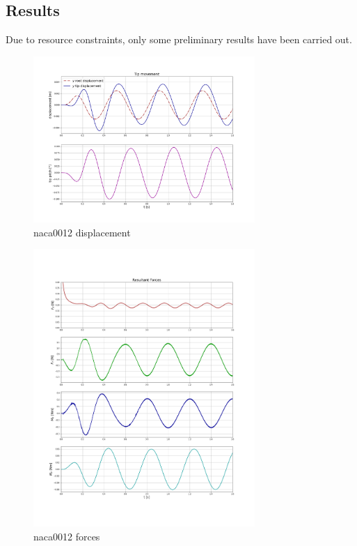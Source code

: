 \subsection{Results}

Due to resource constraints, only some preliminary results have been carried out. 


\begin{figure}[htbp!]
	\centering
	\includegraphics[width=0.75\textwidth]{images/heathcote/naca0012_disp.png}
	\caption{naca0012 displacement}
	\label{fig:hc-tip-disp}
\end{figure}


\begin{figure}[htbp!]
	\centering
	\includegraphics[width=0.75\textwidth]{images/heathcote/forces_naca0012.png}
	\caption{naca0012 forces}
	\label{fig:hc-tip-disp}
\end{figure}



